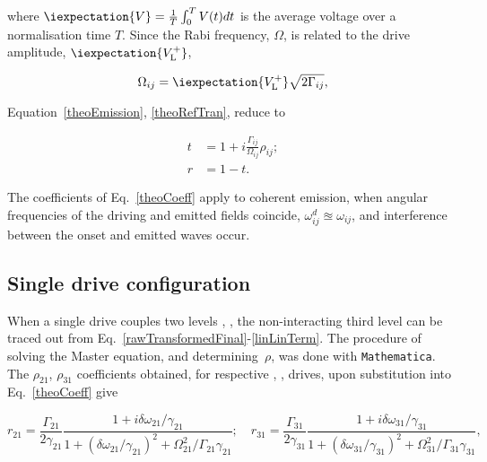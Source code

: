 \noindent where  $\iexpectation{V} =  \frac{1}{T}\int_{0}^{T}V(t)dt$ is
the average  voltage over a  normalisation time $  T $. Since  the Rabi
frequency,   $   \Omega   $,   is    related   to   the   drive   amplitude,
$ \iexpectation{V_{\text{L}}^{+}} $,

\begin{equation}
  \Omega_{ij}=\iexpectation{V_{\text{L}}^{+}}\sqrt{2\Gamma_{ij}},
\end{equation}

\noindent Equation~\eqref{theoEmission}, \eqref{theoRefTran}, reduce to

\begin{equation}\label{theoCoeff}
  \begin{aligned}
    t & = 1 + i\frac{\Gamma_{ij}}{\Omega_{ij}}\rho_{ij};\\
    r & = 1-t.
  \end{aligned}
\end{equation}

\noindent The  coefficients of Eq.~\eqref{theoCoeff} apply  to coherent
emission, when  angular frequencies of  the driving and  emitted fields
coincide,  $ \omega^{d}_{ij}  \approxeq\omega_{ij} $,  and interference
between the onset and emitted waves occur.

  \subsection{Single drive configuration\label{subsec:singleDrive}}
  When  a  single drive  couples  two  levels ,  ,  the
  non-interacting    third   level    can    be    traced   out    from
  Eq.~\eqref{rawTransformedFinal}-\eqref{linLinTerm}.  The procedure of
  solving the  Master equation,  and determining~$ \rho  $, was  done with
  \texttt{Mathematica}. The  $ \rho_{21} $, $  \rho_{31} $ coefficients
  obtained,        for         respective        \ilra{},
  \ilra{},     drives,     upon     substitution     into
  Eq.~\eqref{theoCoeff} give

\begin{equation}
  r_{21}=\frac{\Gamma_{21}}{2\gamma_{21}}\frac{1+i\delta\omega_{21}/\gamma_{21}}{1+(\delta\omega_{21}/\gamma_{21})^2+\Omega_{21}^2/\Gamma_{21}\gamma_{21}}; \quad r_{31}=\frac{\Gamma_{31}}{2\gamma_{31}}\frac{1+i\delta\omega_{31}/\gamma_{31}}{1+(\delta\omega_{31}/\gamma_{31})^2+\Omega_{31}^2/\Gamma_{31}\gamma_{31}},
  \label{singleReflectance}
\end{equation}

